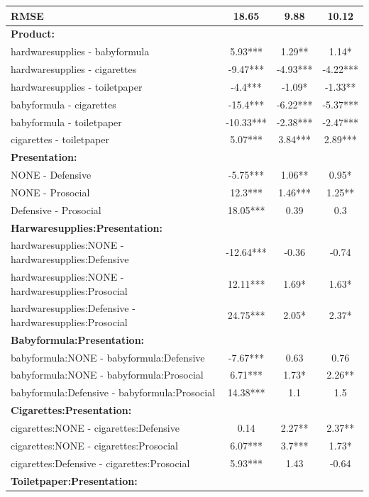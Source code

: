 \documentclass[]{report}
\begin{document}
\begin{table}
{\begin{tabular}[t]{lccc}
			RMSE & \num{18.65} & \num{9.88} & \num{10.12}\\
			\toprule
			\textbf{Product:} &&&\\
			hardwaresupplies - babyformula & 5.93*** & 1.29** & 1.14* \\ 
			hardwaresupplies - cigarettes & -9.47*** & -4.93*** & -4.22*** \\ 
			hardwaresupplies - toiletpaper & -4.4*** & -1.09* & -1.33** \\ 
			babyformula - cigarettes & -15.4*** & -6.22*** & -5.37*** \\ 
			babyformula - toiletpaper & -10.33*** & -2.38*** & -2.47*** \\ 
			cigarettes - toiletpaper & 5.07*** & 3.84*** & 2.89*** \\ 
			\midrule
			\textbf{Presentation:} &&&\\
			NONE - Defensive & -5.75*** & 1.06** & 0.95* \\ 
			NONE - Prosocial & 12.3*** & 1.46*** & 1.25** \\ 
			Defensive - Prosocial & 18.05*** & 0.39 & 0.3 \\ 
			\midrule
			\textbf{Harwaresupplies:Presentation:}  &&&\\
			hardwaresupplies:NONE - hardwaresupplies:Defensive & -12.64*** & -0.36 & -0.74 \\ 
			hardwaresupplies:NONE - hardwaresupplies:Prosocial & 12.11*** & 1.69* & 1.63* \\ 
			hardwaresupplies:Defensive - hardwaresupplies:Prosocial & 24.75*** & 2.05* & 2.37* \\ 
			\midrule
			\textbf{Babyformula:Presentation:} &&&\\
			babyformula:NONE - babyformula:Defensive & -7.67*** & 0.63 & 0.76 \\ 
			babyformula:NONE - babyformula:Prosocial & 6.71*** & 1.73* & 2.26** \\ 
			babyformula:Defensive - babyformula:Prosocial & 14.38*** & 1.1 & 1.5 \\ 
			\midrule
			\textbf{Cigarettes:Presentation:} &&&\\
			cigarettes:NONE - cigarettes:Defensive & 0.14 & 2.27** & 2.37** \\ 
			cigarettes:NONE - cigarettes:Prosocial & 6.07*** & 3.7*** & 1.73* \\ 
			cigarettes:Defensive - cigarettes:Prosocial & 5.93*** & 1.43 & -0.64 \\ 
			\midrule
			\textbf{Toiletpaper:Presentation:} &&&\\

\end{tabular}}
\end{table}
\end{document}
